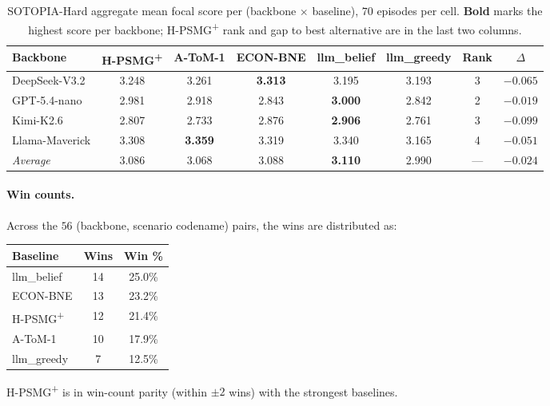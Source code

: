 \begin{table}[h]
\centering\small
\caption{SOTOPIA-Hard aggregate mean focal score per (backbone $\times$ baseline), $70$ episodes per cell. \textbf{Bold} marks the highest score per backbone; H-PSMG\textsuperscript{+} rank and gap to best alternative are in the last two columns.}
\label{tab:sotopia-aggregate}
\begin{tabular}{lccccccc}
\toprule
Backbone & H-PSMG\textsuperscript{+} & A-ToM-1 & ECON-BNE & llm\_belief & llm\_greedy & Rank & $\Delta$ \\
\midrule
DeepSeek-V3.2 & 3.248 & 3.261 & \textbf{3.313} & 3.195 & 3.193 & 3 & $-0.065$ \\
GPT-5.4-nano & 2.981 & 2.918 & 2.843 & \textbf{3.000} & 2.842 & 2 & $-0.019$ \\
Kimi-K2.6 & 2.807 & 2.733 & 2.876 & \textbf{2.906} & 2.761 & 3 & $-0.099$ \\
Llama-Maverick & 3.308 & \textbf{3.359} & 3.319 & 3.340 & 3.165 & 4 & $-0.051$ \\
\midrule
\emph{Average} & 3.086 & 3.068 & 3.088 & \textbf{3.110} & 2.990 & --- & $-0.024$ \\
\bottomrule
\end{tabular}
\end{table}

\paragraph{Win counts.} Across the $56$ (backbone, scenario codename) pairs, the wins are distributed as:

\begin{center}\small
\begin{tabular}{lcc}
\toprule
Baseline & Wins & Win \% \\
\midrule
llm\_belief & 14 & 25.0\% \\
ECON-BNE & 13 & 23.2\% \\
H-PSMG\textsuperscript{+} & 12 & 21.4\% \\
A-ToM-1 & 10 & 17.9\% \\
llm\_greedy & 7 & 12.5\% \\
\bottomrule
\end{tabular}
\end{center}

H-PSMG\textsuperscript{+} is in win-count parity (within $\pm 2$ wins) with the strongest baselines.

